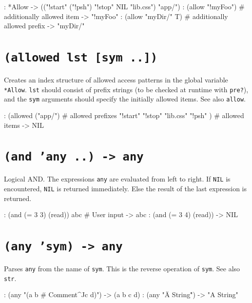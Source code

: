 \begin{wideverbatim}
: *Allow
-> (("!start" ("!psh") "!stop" NIL "lib.css") "app/")
: (allow "!myFoo")  # additionally allowed item
-> "!myFoo"
: (allow "myDir/" T)  # additionally allowed prefix
-> "myDir/"
\end{wideverbatim}

 
\section*{\texttt{(allowed lst [sym ..])}}
\label{sec:func-ref-A-(allowed lst [sym ..])}


Creates an index structure of allowed access patterns in the global
variable \texttt{*Allow}. \texttt{lst} should consist of prefix strings (to be checked
at runtime with \texttt{pre?}), and the \texttt{sym} arguments should specify the
initially allowed items. See also \texttt{allow}.


\begin{wideverbatim}
: (allowed ("app/")  # allowed prefixes
   "!start" "!stop" "lib.css" "!psh" )  # allowed items
-> NIL
\end{wideverbatim}

 
\section*{\texttt{(and 'any ..) -> any}}
\label{sec:func-ref-A-(and 'any ..) -> any}


Logical AND. The expressions \texttt{any} are evaluated from left to right. If
\texttt{NIL} is encountered, \texttt{NIL} is returned immediately. Else the result of
the last expression is returned.


\begin{wideverbatim}
: (and (= 3 3) (read))
abc  # User input
-> abc
: (and (= 3 4) (read))
-> NIL
\end{wideverbatim}

 
\section*{\texttt{(any 'sym) -> any}}
\label{sec:func-ref-A-(any 'sym) -> any}


Parses \texttt{any} from the name of \texttt{sym}. This is the reverse operation of
\texttt{sym}. See also \texttt{str}.


\begin{wideverbatim}
: (any "(a b # Comment^Jc d)")
-> (a b c d)
: (any "\"A String\"")
-> "A String"
\end{wideverbatim}

